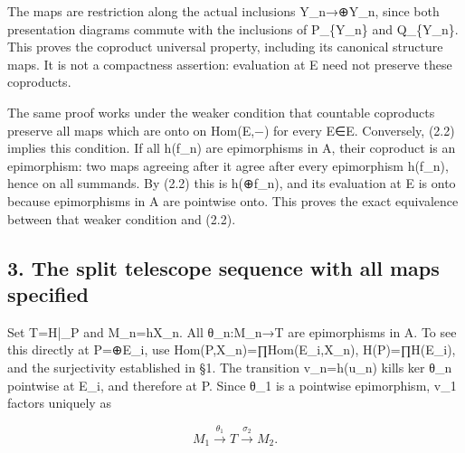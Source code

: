 \documentclass[11pt]{article}
\begin{document}
The maps are restriction along the actual inclusions Y\_\allowbreak{}n\allowbreak{}→\allowbreak{}⊕Y\_\allowbreak{}n,\allowbreak{} since both presentation diagrams commute with the inclusions of P\_\allowbreak{}\{Y\_\allowbreak{}n\} and Q\_\allowbreak{}\{Y\_\allowbreak{}n\}. This proves the coproduct universal property,\allowbreak{} including its canonical structure maps. It is not a compactness assertion:\allowbreak{} evaluation at E need not preserve these coproducts.

The same proof works under the weaker condition that countable coproducts preserve all maps which are onto on Hom(E,\allowbreak{}−)\allowbreak{} for every E\allowbreak{}∈E. Conversely,\allowbreak{} (2.2)\allowbreak{} implies this condition. If all h(f\_\allowbreak{}n)\allowbreak{} are epimorphisms in A,\allowbreak{} their coproduct is an epimorphism:\allowbreak{} two maps agreeing after it agree after every epimorphism h(f\_\allowbreak{}n)\allowbreak{},\allowbreak{} hence on all summands. By (2.2)\allowbreak{} this is h(\allowbreak{}⊕f\_\allowbreak{}n)\allowbreak{},\allowbreak{} and its evaluation at E is onto because epimorphisms in A are pointwise onto. This proves the exact equivalence between that weaker condition and (2.2)\allowbreak{}.

\subsection{3. The split telescope sequence with all maps specified}\label{proofs-11460-11655-the-split-telescope-sequence-with-all-maps-specified}

Set T\allowbreak{}=H|\_\allowbreak{}P and M\_\allowbreak{}n\allowbreak{}=hX\_\allowbreak{}n. All θ\_\allowbreak{}n:\allowbreak{}M\_\allowbreak{}n\allowbreak{}→T are epimorphisms in A. To see this directly at P\allowbreak{}=\allowbreak{}⊕E\_\allowbreak{}i,\allowbreak{} use Hom(P,\allowbreak{}X\_\allowbreak{}n)\allowbreak{}\allowbreak{}=∏Hom(E\_\allowbreak{}i,\allowbreak{}X\_\allowbreak{}n)\allowbreak{},\allowbreak{} H(P)\allowbreak{}\allowbreak{}=∏H(E\_\allowbreak{}i)\allowbreak{},\allowbreak{} and the surjectivity established in §1. The transition v\_\allowbreak{}n\allowbreak{}=h(u\_\allowbreak{}n)\allowbreak{} kills ker θ\_\allowbreak{}n pointwise at E\_\allowbreak{}i,\allowbreak{} and therefore at P. Since θ\_\allowbreak{}1 is a pointwise epimorphism,\allowbreak{} v\_\allowbreak{}1 factors uniquely as

\[
 M_1\xrightarrow{\theta_1}T\xrightarrow{\sigma_2}M_2.
\]
\end{document}
